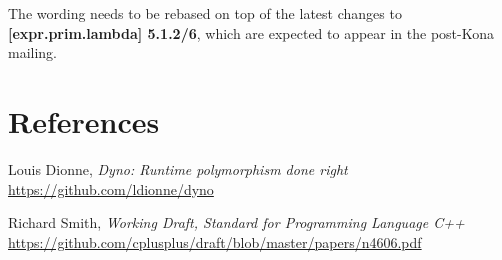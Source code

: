 \documentclass{wg21}
\begin{document}
The wording needs to be rebased on top of the latest changes to
\textbf{[expr.prim.lambda] 5.1.2/6}, which are expected to appear
in the post-Kona mailing.


\section{References}
\renewcommand{\section}[2]{}%
\begin{thebibliography}{9}

    Louis Dionne,
    \emph{Dyno: Runtime polymorphism done right}\newline
    \url{https://github.com/ldionne/dyno}

    Richard Smith,
    \emph{Working Draft, Standard for Programming Language C++}\newline
    \url{https://github.com/cplusplus/draft/blob/master/papers/n4606.pdf}

\end{thebibliography}
\end{document}
